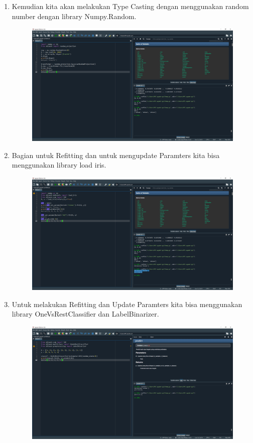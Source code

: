 \begin{enumerate}
\begin{figure}[!htbp]
\end{figure}
\item Kemudian kita akan melakukan Type Casting dengan menggunakan random number dengan library Numpy.Random.
\begin{figure}[!htbp]
	\centering
	\includegraphics[scale=0.3]{figures/3.png}
\end{figure}
\newpage
\item Bagian untuk Refitting dan untuk mengupdate Paramters kita bisa menggunakan library load iris.
\begin{figure}[!htbp]
	\centering
	\includegraphics[scale=0.3]{figures/4.png}
\end{figure}
\item Untuk melakukan Refitting dan Update Paramters kita bisa menggunakan library OneVsRestClassifier dan LabelBinarizer.
\begin{figure}[!htbp]
	\centering
	\includegraphics[scale=0.3]{figures/5.png}

\end{figure}
\end{enumerate}
